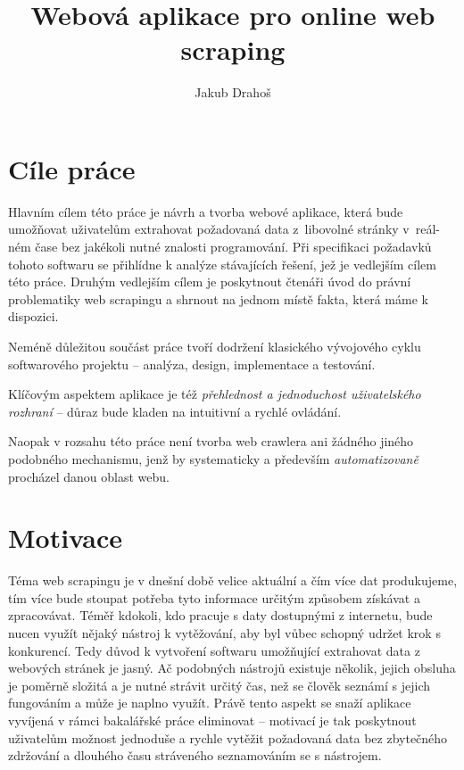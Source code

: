 \documentclass[thesis=B,czech]{FITthesis}[2012/06/26]
\title{Webová aplikace pro online web scraping}
\author{Jakub Drahoš} %
\begin{document}

\begin{introduction}
	\vfill
	\section*{Cíle práce}
	Hlavním cílem této práce je návrh a tvorba webové aplikace, která bude umožňovat uživatelům extrahovat požadovaná data z~libovolné stránky v~reál-ném čase bez jakékoli nutné znalosti programování. Při specifikaci požadavků tohoto softwaru se přihlídne k analýze stávajících řešení, jež je vedlejším cílem této práce. Druhým vedlejším cílem je poskytnout čtenáři úvod do právní problematiky web scrapingu a shrnout na jednom místě fakta, která máme k dispozici.
	
	Neméně důležitou součást práce tvoří dodržení klasického vývojového cyklu softwarového projektu -- analýza, design, implementace a testování.
	
	Klíčovým aspektem aplikace je též \emph{přehlednost a jednoduchost uživatelského rozhraní} -- důraz bude kladen na intuitivní a rychlé ovládání.
	
	Naopak v rozsahu této práce není tvorba web crawlera ani žádného jiného podobného mechanismu, jenž by systematicky a především \emph{automatizovaně} procházel danou oblast webu.
	
	\section*{Motivace}
	Téma web scrapingu je v dnešní době velice aktuální a čím více dat produkujeme, tím více bude stoupat potřeba tyto informace určitým způsobem získávat a zpracovávat. Téměř kdokoli, kdo pracuje s daty dostupnými z internetu, bude nucen využít nějaký nástroj k vytěžování, aby byl vůbec schopný udržet krok s konkurencí.
	\newpage
	Tedy důvod k vytvoření softwaru umožňující extrahovat data z webových stránek je jasný. Ač podobných nástrojů existuje několik, jejich obsluha je poměrně složitá a je nutné strávit určitý čas, než se člověk seznámí s jejich fungováním a může je naplno využít. Právě tento aspekt se snaží aplikace vyvíjená v rámci bakalářské práce eliminovat -- motivací je tak poskytnout uživatelům možnost jednoduše a rychle vytěžit požadovaná data bez zbytečného zdržování a dlouhého času stráveného seznamováním se s nástrojem.
	

\end{introduction}
\end{document}
